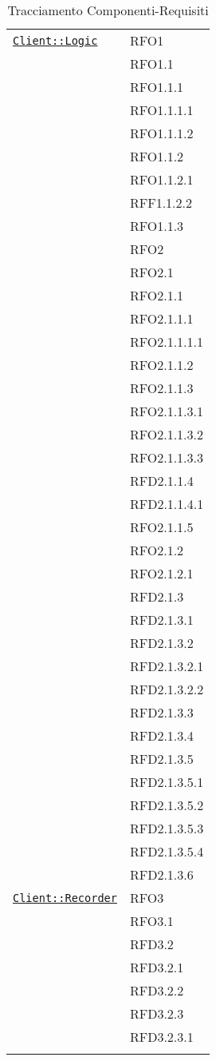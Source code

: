 \begin{longtable}{|>{\centering}m{10cm}|m{3cm}<{\centering}|}
\hyperref[Client::Logic]{\texttt{Client::Logic}} & RFO1\\
& RFO1.1\\
& RFO1.1.1\\
& RFO1.1.1.1\\
& RFO1.1.1.2\\
& RFO1.1.2\\
& RFO1.1.2.1\\
& RFF1.1.2.2\\
& RFO1.1.3\\
& RFO2\\
& RFO2.1\\
& RFO2.1.1\\
& RFO2.1.1.1\\
& RFO2.1.1.1.1\\
& RFO2.1.1.2\\
& RFO2.1.1.3\\
& RFO2.1.1.3.1\\
& RFO2.1.1.3.2\\
& RFO2.1.1.3.3\\
& RFD2.1.1.4\\
& RFD2.1.1.4.1\\
& RFO2.1.1.5\\
& RFO2.1.2\\
& RFO2.1.2.1\\
& RFD2.1.3\\
& RFD2.1.3.1\\
& RFD2.1.3.2\\
& RFD2.1.3.2.1\\
& RFD2.1.3.2.2\\
& RFD2.1.3.3\\
& RFD2.1.3.4\\
& RFD2.1.3.5\\
& RFD2.1.3.5.1\\
& RFD2.1.3.5.2\\
& RFD2.1.3.5.3\\
& RFD2.1.3.5.4\\
& RFD2.1.3.6\\ \hline

\hyperref[Client::Recorder]{\texttt{Client::Recorder}} & RFO3\\
& RFO3.1\\
& RFD3.2\\
& RFD3.2.1\\
& RFD3.2.2\\
& RFD3.2.3\\
& RFD3.2.3.1\\ \hline

\caption[Tracciamento Componenti-Requisiti]{Tracciamento Componenti-Requisiti}
\label{tabella:pack-requi}
\end{longtable}
\clearpage
